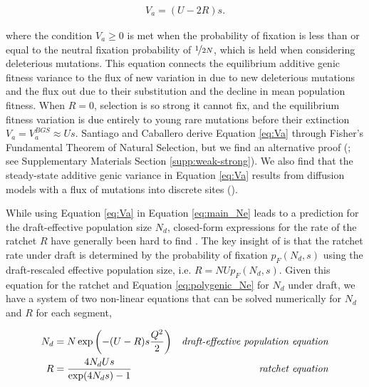 \documentclass[11pt]{article}
\begin{document}
\begin{align}
  \label{eq:Va}
  V_{a} = (U - 2 R)s. 
\end{align}

where the condition $V_a \ge 0$ is met when the probability of fixation is less
than or equal to the neutral fixation probability of $\nicefrac{1}{2N}$, which
is held when considering deleterious mutations. This equation connects the
equilibrium additive genic fitness variance to the flux of new variation in due
to new deleterious mutations and the flux out due to their substitution and the
decline in mean population fitness. When $R=0$, selection is so strong it
cannot fix, and the equilibrium fitness variation is due entirely to young rare
mutations before their extinction $V_a = V_a^{BGS} \approx Us$. Santiago and
Caballero derive Equation \eqref{eq:Va} through Fisher's Fundamental Theorem of
Natural Selection, but we find an alternative proof (\cite{Higgs1995-xc}; see
Supplementary Materials Section \ref{supp:weak-strong}). We also find that the
steady-state additive genic variance in Equation \eqref{eq:Va} results from
diffusion models with a flux of mutations into discrete sites
(\cite{Kimura1969-jw}). 


While using Equation \eqref{eq:Va} in Equation \eqref{eq:main_Ne} leads to a
prediction for the draft-effective population size $N_d$, closed-form
expressions for the rate of the ratchet $R$ have generally been hard to find
\parencite{Haigh1978-gt,Higgs1995-xc,Gessler1995-hz}. The key insight of
\textcite{Santiago2016-mu} is that the ratchet rate under draft is determined
by the probability of fixation $p_F(N_d, s)$
\parencite{Kimura1962-su,Malecot1952-qh} using the draft-rescaled effective
population size, i.e. $R = N U p_F(N_d, s)$. Given this equation for the
ratchet and Equation \eqref{eq:polygenic_Ne} for $N_d$ under draft, we have a
system of two non-linear equations that can be solved numerically for $N_d$ and
$R$ for each segment,

\begin{align}
  \label{eq:main_eqns}
  N_d &= N \exp \left( -(U-R)s \frac{Q^2}{2} \right) & \text{\emph{draft-effective population equation}} \\
  R &= \frac{4N_d U s}{\exp(4 N_d s)-1}  & \text{\emph{ratchet equation}}
\end{align}
%
\end{document}
